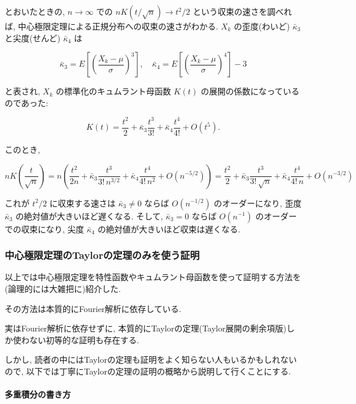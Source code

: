 \documentclass[
  letterpaper,
  DIV=11,
  numbers=noendperiod]{scrartcl}
\let\oldparagraph\paragraph
\renewcommand{\paragraph}[1]{\oldparagraph{#1}\mbox{}}
\begin{document}
とおいたときの, \(n\to\infty\) での \(n K(t/\sqrt{n}) \to t^2/2\)
という収束の速さを調べれば,
中心極限定理による正規分布への収束の速さがわかる. \(X_k\) の歪度(わいど)
\(\bar\kappa_3\) と尖度(せんど) \(\bar\kappa_4\) は

\[
\bar\kappa_3 = E\left[\left(\frac{X_k - \mu}{\sigma}\right)^3\right], \quad
\bar\kappa_4 = E\left[\left(\frac{X_k - \mu}{\sigma}\right)^4\right] - 3
\]

と表され, \(X_k\) の標準化のキュムラント母函数 \(K(t)\)
の展開の係数になっているのであった:

\[
K(t) = \frac{t^2}{2} + \bar\kappa_3\frac{t^3}{3!} + \bar\kappa_4\frac{t^4}{4!} + O(t^5).
\]

このとき,

\[
n K\left(\frac{t}{\sqrt{n}}\right) =
n\left(
\frac{t^2}{2n} + \bar\kappa_3\frac{t^3}{3!\,n^{3/2}} + \bar\kappa_4\frac{t^4}{4!\,n^2} + O(n^{-5/2})
\right) =
\frac{t^2}{2} + \bar\kappa_3\frac{t^3}{3!\,\sqrt{n}} + \bar\kappa_4\frac{t^4}{4!\,n} + O(n^{-3/2})
\]

これが \(t^2/2\) に収束する速さは \(\bar\kappa_3 \ne 0\) ならば
\(O(n^{-1/2})\) のオーダーになり, 歪度 \(\bar\kappa_3\)
の絶対値が大きいほど遅くなる. そして, \(\bar\kappa_3 = 0\) ならば
\(O(n^{-1})\) のオーダーでの収束になり, 尖度 \(\bar\kappa_4\)
の絶対値が大きいほど収束は遅くなる.

\hypertarget{ux4e2dux5fc3ux6975ux9650ux5b9aux7406ux306etaylorux306eux5b9aux7406ux306eux307fux3092ux4f7fux3046ux8a3cux660e}{%
\subsubsection{中心極限定理のTaylorの定理のみを使う証明}\label{ux4e2dux5fc3ux6975ux9650ux5b9aux7406ux306etaylorux306eux5b9aux7406ux306eux307fux3092ux4f7fux3046ux8a3cux660e}}

以上では中心極限定理を特性函数やキュムラント母函数を使って証明する方法を(論理的には大雑把に)紹介した.

その方法は本質的にFourier解析に依存している.

実はFourier解析に依存せずに,
本質的にTaylorの定理(Taylor展開の剰余項版)しか使わない初等的な証明も存在する.

しかし,
読者の中にはTaylorの定理も証明をよく知らない人もいるかもしれないので,
以下では丁寧にTaylorの定理の証明の概略から説明して行くことにする.

\hypertarget{ux591aux91cdux7a4dux5206ux306eux66f8ux304dux65b9}{%
\paragraph{多重積分の書き方}\label{ux591aux91cdux7a4dux5206ux306eux66f8ux304dux65b9}}
\end{document}
